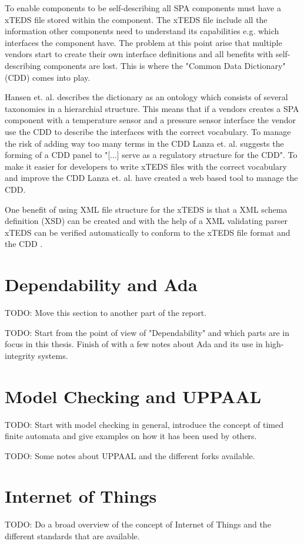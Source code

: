 
To enable components to be self-describing all SPA components must have a xTEDS
file stored within the component. The xTEDS file include all the information
other components need to understand its capabilities e.g. which interfaces the
component have. The problem at this point arise that multiple vendors start to
create their own interface definitions and all benefits with self-describing
components are lost. This is where the "Common Data Dictionary" (CDD) comes
into play.

Hansen et. al.  \cite{hansen2012} describes the dictionary as an ontology which
consists of several taxonomies in a hierarchial structure. This means that if a
vendors creates a SPA component with a temperature sensor and a pressure sensor
interface the vendor use the CDD to describe the interfaces with the correct
vocabulary. To manage the risk of adding way too many terms in the CDD Lanza
et. al. \cite{lanza2010} suggests the forming of a CDD panel to "[...] serve as
a regulatory structure for the CDD". To make it easier for developers to write
xTEDS files with the correct vocabulary and improve the CDD Lanza et. al.
\cite{lanza2010} have created a web based tool to manage the CDD.

One benefit of using XML file structure for the xTEDS is that a XML schema
definition (XSD) can be created and with the help of a XML validating parser
xTEDS can be verified automatically to conform to the xTEDS file format and the
CDD \cite{lanza2010}.



\section{Dependability and Ada}
TODO: Move this section to another part of the report.

TODO: Start from the point of view of "Dependability" and which parts are in
focus in this thesis. Finish of with a few notes about Ada and its use in
high-integrity systems.

\section{Model Checking and UPPAAL}
TODO: Start with model checking in general, introduce the concept of timed
finite automata and give examples on how it has been used by others.

TODO: Some notes about UPPAAL and the different forks available.

\section{Internet of Things}
TODO: Do a broad overview of the concept of Internet of Things and the
different standards that are available.
